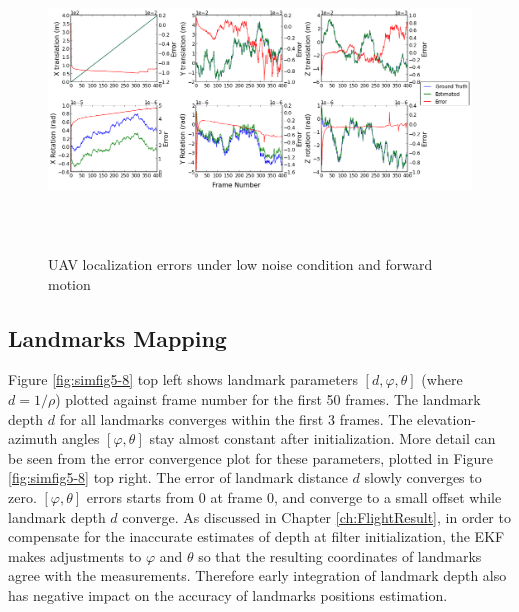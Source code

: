 \begin{figure}[h]
\centering
\includegraphics[width=16cm, height=8cm]{./Figures/SimulationFigures/Figure1.png}
\caption{UAV localization errors under low noise condition and forward motion}
\label{fig:simfig1}
\end{figure}
\FloatBarrier

\subsection{Landmarks Mapping}
Figure \ref{fig:simfig5-8} top left shows landmark parameters $[d,
\varphi ,\theta]$ (where $d=1/\rho $) plotted against frame number for
the first 50 frames. The landmark depth $d$ for all landmarks
converges within the first 3 frames. The elevation-azimuth angles
$[\varphi ,\theta]$ stay almost constant after initialization. More
detail can be seen from the error convergence plot for these
parameters, plotted in Figure \ref{fig:simfig5-8} top right. The error
of landmark distance $d$ slowly converges to zero. $[\varphi ,\theta]$
errors starts from 0 at frame 0, and converge to a small offset
while landmark depth $d$ converge. As discussed in Chapter
\ref{ch:FlightResult}, in order to compensate for the inaccurate
estimates of depth at filter initialization, the EKF makes adjustments
to $\varphi$ and $\theta$ so that the resulting coordinates of
landmarks agree with the measurements. Therefore early integration of
landmark depth also has negative impact on the accuracy of landmarks
positions estimation.

